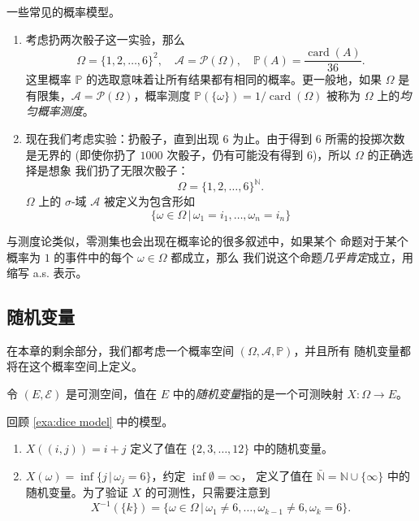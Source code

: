 \documentclass[fontset=none]{Notes}
\DeclareMathOperator\card{card}
\begin{document}
\begin{example}\label{exa:dice model}
  一些常见的概率模型。
  \begin{enumerate}
    \item 考虑扔两次骰子这一实验，那么
    \[
      \Omega=\{1,2,\dots,6\}^2,\quad \mathcal{A}=\mathcal{P}(\Omega),\quad
      \mathbb{P}(A)=\frac{\card(A)}{36}.
    \]
    这里概率 $\mathbb{P}$ 的选取意味着让所有结果都有相同的概率。更一般地，如果 $\Omega$
    是有限集，$\mathcal{A}=\mathcal{P}(\Omega)$，概率测度 $\mathbb{P}(\{\omega\})=1/\card(\Omega)$
    被称为 $\Omega$ 上的\emph{均匀概率测度}。
    \item 现在我们考虑实验：扔骰子，直到出现 $6$ 为止。由于得到 $6$ 所需的投掷次数是无界的
    (即使你扔了 $1000$ 次骰子，仍有可能没有得到 $6$)，所以 $\Omega$ 的正确选择是想象
    我们扔了无限次骰子：
    \[
      \Omega=\{1,2,\dots,6\}^{\mathbb{N}}.
    \]
    $\Omega$ 上的 $\sigma$-域 $\mathcal{A}$ 被定义为包含形如
    \[
      \{\omega\in\Omega\,|\, \omega_1=i_1,\dots,\omega_n=i_n\}
    \]
  \end{enumerate}
\end{example}

与测度论类似，零测集也会出现在概率论的很多叙述中，如果某个
命题对于某个概率为 $1$ 的事件中的每个 $\omega\in\Omega$ 都成立，那么
我们说这个命题\emph{几乎肯定}成立，用缩写 a.s. 表示。


\subsection{随机变量}

在本章的剩余部分，我们都考虑一个概率空间 $(\Omega,\mathcal{A},\mathbb{P})$，并且所有
随机变量都将在这个概率空间上定义。

\begin{definition}
  令 $(E,\mathcal{E})$ 是可测空间，值在 $E$ 中的\emph{随机变量}指的是一个可测映射
  $X:\Omega\to E$。
\end{definition}

\begin{example}
  回顾 \eqref{exa:dice model} 中的模型。
  \begin{enumerate}
    \item $X((i,j))=i+j$ 定义了值在 $\{2,3,\dots,12\}$ 中的随机变量。
    \item $X(\omega)=\inf\{j\,|\, \omega_j=6\}$，约定 $\inf \emptyset=\infty$，
    定义了值在 $\bar{\mathbb{N}}=\mathbb{N}\cup\{\infty\}$ 中的随机变量。为了验证
    $X$ 的可测性，只需要注意到
    \[
      X^{-1}(\{k\})=\{\omega\in\Omega\,|\, \omega_1\neq 6,\dots,\omega_{k-1}\neq 6,\omega_k=6\}.
    \]
  \end{enumerate}
\end{example}
\end{document}
